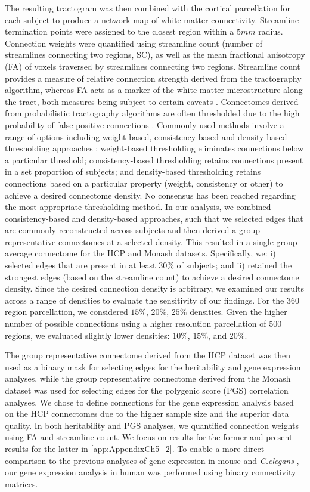 The resulting tractogram was then combined with the cortical parcellation for each subject to produce a network map of white matter connectivity. Streamline termination points were assigned to the closest region within a $5mm$ radius. Connection weights were quantified using streamline count (number of streamlines connecting two regions, SC), as well as the mean fractional anisotropy (FA) of voxels traversed by streamlines connecting two regions. Streamline count provides a measure of relative connection strength derived from the tractography algorithm, whereas FA acts as a marker of the white matter microstructure along the tract, both measures being subject to certain caveats \citep{Jones2013}.
Connectomes derived from probabilistic tractography algorithms are often thresholded due to the high probability of false positive connections \citep{Sarwar2019,Sotiropoulos2017}. Commonly used methods involve a range of options including weight-based, consistency-based and density-based thresholding approaches \citep{Betzel2018,Roberts2016a}: weight-based thresholding eliminates connections below a particular threshold; consistency-based thresholding retains connections present in a set proportion of subjects; and density-based thresholding retains connections based on a particular property (weight, consistency or other) to achieve a desired connectome density. No consensus has been reached regarding the most appropriate thresholding method. In our analysis, we combined consistency-based and density-based approaches, such that we selected edges that are commonly reconstructed across subjects and then derived a group-representative connectomes at a selected density. This resulted in a single group-average connectome for the HCP and Monash datasets. Specifically, we: i) selected edges that are present in at least $30\%$ of subjects; and ii) retained the strongest edges (based on the streamline count) to achieve a desired connectome density. Since the desired connection density is arbitrary, we examined our results across a range of densities to evaluate the sensitivity of our findings. For the 360 region parcellation, we considered $15\%$, $20\%$, $25\%$ densities. Given the higher number of possible connections using a higher resolution parcellation of 500 regions, we evaluated slightly lower densities: $10\%$, $15\%$, and $20\%$.

The group representative connectome derived from the HCP dataset was then used as a binary mask for selecting edges for the heritability and gene expression analyses, while the group representative connectome derived from the Monash dataset was used for selecting edges for the polygenic score (PGS) correlation analyses. We chose to define connections for the gene expression analysis based on the HCP connectomes due to the higher sample size and the superior data quality. In both heritability and PGS analyses, we quantified connection weights using FA and streamline count. We focus on results for the former and present results for the latter in \ref{app:AppendixCh5_2}. To enable a more direct comparison to the previous analyses of gene expression in mouse \citep{Fulcher2016} and \textit{C.elegans} \citep{Arnatkeviciute2018}, our gene expression analysis in human was performed using binary connectivity matrices.


